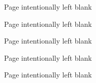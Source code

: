 \documentclass[12pts,twoside,a4paper]{report}
\title{\thesistitle}
\author{\authorname}
\date{\today}
\begin{document}
 

	
 	\clearpage
 		Page intentionally left blank
 		
%  	
	
 	\clearpage
 		Page intentionally left blank

% 	
	
	\clearpage
		Page intentionally left blank
		
	
	\clearpage
		Page intentionally left blank
 		

	\tableofcontents
	\listoffigures
	\listoftables

	
	\clearpage
		Page intentionally left blank

	
    
    
    
    
    
 	

	\singlespacing
	
	
\end{document}
